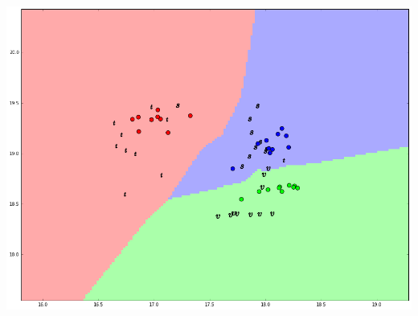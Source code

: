 \documentclass[a4paper,12px,twocolumn]{article}
\begin{document}
\begin{flushleft}
    \includegraphics[scale=0.25]{testpoints}

    \bigskip


\end{flushleft}
\end{document}
